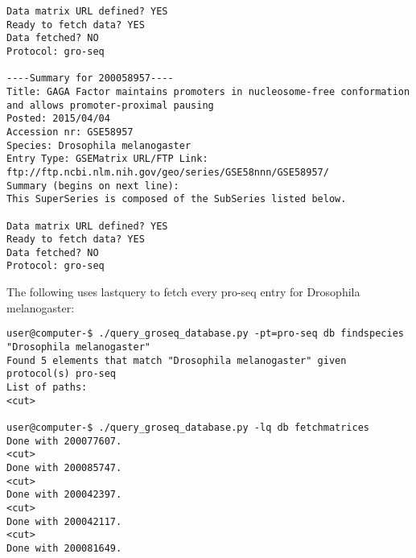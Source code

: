\documentclass[12pt,letterpaper]{article}
\begin{document}
\begin{verbatim}
Data matrix URL defined? YES
Ready to fetch data? YES
Data fetched? NO
Protocol: gro-seq

----Summary for 200058957----
Title: GAGA Factor maintains promoters in nucleosome-free conformation and allows promoter-proximal pausing
Posted: 2015/04/04
Accession nr: GSE58957
Species: Drosophila melanogaster
Entry Type: GSEMatrix URL/FTP Link: ftp://ftp.ncbi.nlm.nih.gov/geo/series/GSE58nnn/GSE58957/
Summary (begins on next line):
This SuperSeries is composed of the SubSeries listed below.

Data matrix URL defined? YES
Ready to fetch data? YES
Data fetched? NO
Protocol: gro-seq
\end{verbatim}

The following uses lastquery to fetch every pro-seq entry for Drosophila melanogaster:
\begin{verbatim}
user@computer-$ ./query_groseq_database.py -pt=pro-seq db findspecies "Drosophila melanogaster"
Found 5 elements that match "Drosophila melanogaster" given protocol(s) pro-seq
List of paths:
<cut>

user@computer-$ ./query_groseq_database.py -lq db fetchmatrices
Done with 200077607.
<cut>
Done with 200085747.
<cut>
Done with 200042397.
<cut>
Done with 200042117.
<cut>
Done with 200081649.
\end{verbatim}
\end{document}
